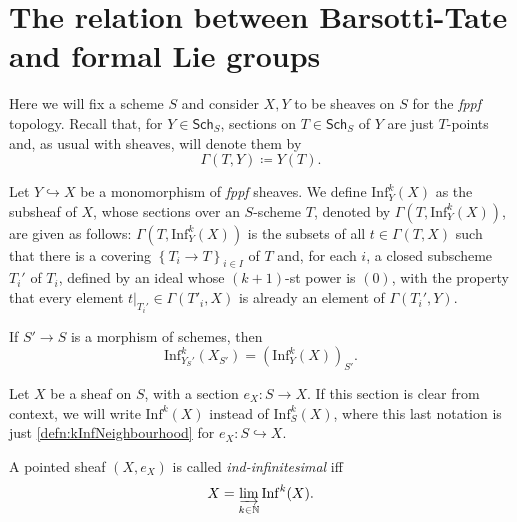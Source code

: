 \documentclass[../Main]{subfiles}
\begin{document}
\section{The relation between Barsotti-Tate and formal Lie groups}
Here we will fix a scheme $S$ and consider $X, Y$ to be sheaves on $S$
for the {\em fppf} topology.
Recall that, for $Y \in \mathsf{Sch}_{ S }$, sections on
$T \in \mathsf{Sch}_{ S }$ of $Y$ are just $T$-points and,
as usual with sheaves, will denote them by
\begin{equation*}
	\Gamma \left( T, Y \right) \coloneqq Y(T)
.\end{equation*}


\begin{defn}\label{defn:kInfNeighbourhood}
	Let $Y \hookrightarrow X$ be a monomorphism of {\em fppf} sheaves.
	We define $\mathrm{Inf}_Y^k(X)$ as the subsheaf of $X$,
	whose sections over an $S$-scheme $T$, denoted by $\Gamma ( T , \mathrm{Inf}_Y^k(X) )$,
	are given as follows:
	$\Gamma ( T , \mathrm{Inf}_Y^k(X) )$ is the subsets of all 
	$t \in \Gamma \left( T, X \right)$ such that
	there is a covering $\left\{ T_{ i } \to T \right\}_{ i \in I }$
	of $T$ and, for each $i$, a closed subscheme $T_i'$ of $T_i$,
	defined by an ideal whose $(k+1)$-st power is $(0)$,
	with the property that every element $\left.t\right|_{T_i'} \in \Gamma(T'_i, X)$
	is already an element of $\Gamma(T_i', Y)$.
\end{defn}


\begin{lem}
	If $S' \to S$ is a morphism of schemes, then
	\begin{equation*}
		\mathrm{Inf}_{Y_{S}'}^k (X_{S'}) =
		(\mathrm{Inf}_Y^k(X))_{S'}
	.\end{equation*}
\end{lem} 

\begin{defn}[]
	Let $X$ be a sheaf on $S$, with a section $e_X\colon S \to X$.
	If this section is clear from context, we will write $\mathrm{Inf}^k(X)$
	instead of $\mathrm{Inf}_S^k(X)$, where this last notation is 
	just \cref{defn:kInfNeighbourhood} for $e_X\colon S \hookrightarrow X$.
\end{defn}

\begin{defn}
	A pointed sheaf $\left(X, e_X\right)$ is called {\em ind-infinitesimal} iff
	\begin{equation*}
		X = \varinjlim_{k \in \mathbb{N}} \mathrm{Inf}^k(X)
	.\end{equation*}
\end{defn}
\end{document}
